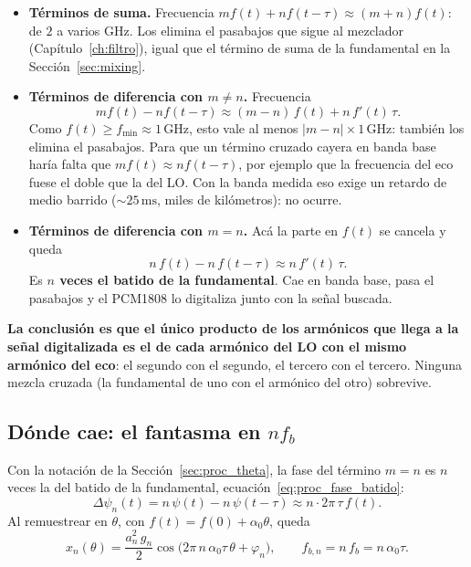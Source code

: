\documentclass[12pt, a4paper, twoside]{report}
\begin{document}
\begin{itemize}
  \item \textbf{Términos de suma.} Frecuencia $m f(t) + n f(t-\tau) \approx
    (m+n) f(t)$: de $2$ a varios GHz. Los elimina el pasabajos que sigue al
    mezclador (Capítulo~\ref{ch:filtro}), igual que el término de suma de la
    fundamental en la Sección~\ref{sec:mixing}.
  \item \textbf{Términos de diferencia con $m \neq n$.} Frecuencia
    \begin{equation}
      m f(t) - n f(t-\tau) \approx (m-n)\,f(t) + n\,f'(t)\,\tau .
    \end{equation}
    Como $f(t) \geq f_\text{min} \approx 1\,\text{GHz}$, esto vale al menos
    $|m-n| \times 1\,\text{GHz}$: también los elimina el pasabajos. Para que
    un término cruzado cayera en banda base haría falta que $m f(t) \approx n
    f(t-\tau)$, por ejemplo que la frecuencia del eco fuese el doble que la
    del LO. Con la banda medida eso exige un retardo de medio barrido
    ($\sim\!25\,\text{ms}$, miles de kilómetros): no ocurre.
  \item \textbf{Términos de diferencia con $m = n$.} Acá la parte en
    $f(t)$ se cancela y queda
    \begin{equation}
      n\,f(t) - n\,f(t-\tau) \approx n\,f'(t)\,\tau .
    \end{equation}
    Es \textbf{$n$ veces el batido de la fundamental}. Cae en banda base,
    pasa el pasabajos y el PCM1808 lo digitaliza junto con la señal buscada.
\end{itemize}

\textbf{La conclusión es que el único producto de los armónicos que llega a la
señal digitalizada es el de cada armónico del LO con el mismo armónico del
eco}: el segundo con el segundo, el tercero con el tercero. Ninguna mezcla
cruzada (la fundamental de uno con el armónico del otro) sobrevive.

\subsection{Dónde cae: el fantasma en $n f_b$}
\label{sub:armonicos_fantasma}

Con la notación de la Sección~\ref{sec:proc_theta}, la fase del término
$m=n$ es $n$ veces la del batido de la fundamental,
ecuación~\eqref{eq:proc_fase_batido}:
\begin{equation}
  \Delta\psi_n(t) = n\,\psi(t) - n\,\psi(t-\tau) \approx n \cdot 2\pi\,\tau\,f(t).
\end{equation}
Al remuestrear en $\theta$, con $f(t) = f(0) + \alpha_0\theta$, queda
\begin{equation}
  \boxed{\;
  x_n(\theta) = \frac{a_n^2\,g_n}{2}
  \cos\!\bigl(2\pi\,n\,\alpha_0\tau\,\theta + \varphi_n\bigr),
  \qquad f_{b,n} = n\,f_b = n\,\alpha_0\tau .
  \;}
  \label{eq:fantasma}
\end{equation}
\end{document}

